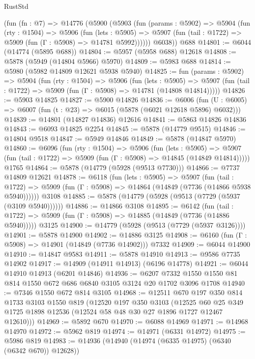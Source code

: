 \begin{lexlean}{RustStd}
\begin{coremodule}
    (fun (fn : @7) =>
    @14776
      (@5900
        (@5903
          (fun (params : @5902) =>
          @5904
            (fun (rty : @1504) =>
            @5906
              (fun (lets : @5905) =>
              @5907 (fun (tail : @1722) => @5909 (fun (Γ : @5908) => @14781 @5992))))))
        @6038))
    @688
@14801 := @6044 (@14774 (@5895 @688))
@14804 := @5957 (@5958 @688) @12618
@14808 := @5878 (@5949 (@14804 @5966) @5970)
@14809 := @5983 @688
@14814 := @5980 (@5982 @14809 @12621 @5938 @5940)
@14825 := fun (params : @5902) =>
  @5904
    (fun (rty : @1504) =>
    @5906
      (fun (lets : @5905) =>
      @5907 (fun (tail : @1722) => @5909 (fun (Γ : @5908) => @14781 (@14808 @14814)))))
@14826 := @5903 @14825
@14827 := @5900 @14826
@14836 := @6006
    (fun (U : @6005) => @6007 (fun (t : @23) => @6015 (@5878 (@6021 @12618 @5896) @6032)))
@14839 := @14801 (@14827 @14836) @12616
@14841 := @5863 @14826 @14836
@14843 := @6093 @14825 @2254
@14845 := @5878 (@14779 @9515)
@14846 := @14804 @9518
@14847 := @5949 @14846
@14849 := @5878 (@14847 @5970)
@14860 := @6096
    (fun (rty : @1504) =>
    @5906
      (fun (lets : @5905) =>
      @5907 (fun (tail : @1722) => @5909 (fun (Γ : @5908) => @14845 (@14849 @14814)))))
    @1765
@14864 := @5878 (@14779 (@5928 (@9513 @7730)))
@14866 := @7737 @14809 @12621
@14878 := @6118
    (fun (lets : @5905) =>
    @5907
      (fun (tail : @1722) =>
      @5909 (fun (Γ : @5908) => @14864 (@14849 (@7736 (@14866 @5938 @5940))))))
    @3108
@14885 := @5878 (@14779 (@5928 (@9513 (@7729 (@5937 (@3109 @5940))))))
@14886 := @14866 @3108
@14895 := @6142
    (fun (tail : @1722) => @5909 (fun (Γ : @5908) => @14885 (@14849 (@7736 (@14886 @5940)))))
    @3125
@14900 := @14779 (@5928 (@9513 (@7729 (@5937 @3126))))
@14901 := @5878 @14900
@14902 := @14886 @3125
@14908 := @6160 (fun (Γ : @5908) => @14901 (@14849 (@7736 @14902))) @7332
@14909 := @6044 @14900
@14910 := @14847 @9583
@14911 := @5878 @14910
@14913 := @9586 @7735 @14902
@14917 := @14909 (@14911 @14913) (@6196 @14778)
@14921 := @6044 @14910 @14913 (@6201 @14846)
@14936 := @6207 @7332 @1550 @1550 @81 @814 @1550 @672 @686 @6840 @3105 @3124 @20 @1702 @3096 @1708
@14940 := @7346 @1550 @672 @814 @3105
@14968 := @12511
    @670
    @197
    @350
    @814
    @1733
    @3103
    @1550
    @819
    (@12520
      @197
      @350
      @3103
      (@12525 @60 @25 @349 @1725 @1898 @12536 (@12524 @58 @48 @30 @27 @1896 @1727 @12467 @12610)))
@14969 := @5892 @670
@14970 := @6088 @14969
@14971 := @14968 @14970
@14972 := @5962 @819
@14974 := @14971 (@6331 @14972)
@14975 := @5986 @819
@14983 := @14936 (@14940 (@14974 (@6335 @14975) (@6340 (@6342 @670)) @12628))

\end{coremodule}
\end{lexlean}
